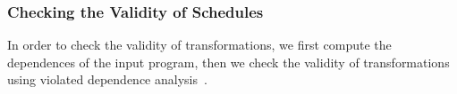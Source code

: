 





\vspace{-0.25cm}
\subsubsection{Checking the Validity of Schedules}

In order to check the validity of transformations, we first compute the dependences of the input program, then we check the validity of transformations using violated dependence analysis~\cite{vasilache_violated_2006}.%